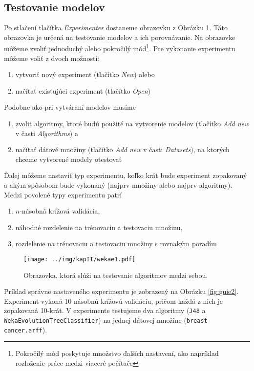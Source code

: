 \pagebreak

\subsection*{Testovanie modelov}
Po stlačení tlačítka \emph{Experimenter} dostaneme obrazovku z Obrázku \ref{fig:guie1}. Táto obrazovka je určená na testovanie modelov a ich porovnávanie. Na obrazovke môžeme zvoliť jednoduchý alebo pokročilý mód\footnote{Pokročilý mód poskytuje množstvo ďalších nastavení, ako napríklad rozloženie práce medzi viaceré počítače}. 
Pre vykonanie experimentu môžeme voliť z dvoch možností:
\begin{enumerate}
\item vytvoriť nový experiment (tlačítko \emph{New}) alebo
\item načítať existujúci experiment (tlačítko \emph{Open})
\end{enumerate} 

Podobne ako pri vytváraní modelov musíme
\begin{enumerate}
\item zvoliť algoritmy, ktoré budú použité na vytvorenie modelov (tlačítko \emph{Add new} v časti \emph{Algorithms}) a
\item načítať dátové množiny (tlačítko \emph{Add new} v časti \emph{Datasets}), na ktorých chceme vytvorené modely otestovať 
\end{enumerate}

Ďalej môžeme nastaviť typ experimentu, koľko krát bude experiment zopakovaný a akým spôsobom bude vykonaný (najprv množiny alebo najprv algoritmy). Medzi povolené typy experimentu patrí
\begin{enumerate}
\item $n$-násobná krížová validácia,
\item náhodné rozdelenie na trénovaciu a testovaciu množinu,
\item rozdelenie na trénovaciu a testovaciu množiny s rovnakým poradím
\end{enumerate}

\begin{figure}[h!]
\centering
\centerline{\mbox{\texttt{[image: ../img/kapII/wekae1.pdf]}}}
\caption{Obrazovka, ktorá slúži na testovanie algoritmov medzi sebou.}\label{fig:guie1}
\end{figure}

Príklad správne nastaveného experimentu je zobrazený na Obrázku \ref{fig:guie2}. Experiment vykoná 10-násobnú krížovú validáciu, pričom každá z nich je zopakovaná 10-krát. V experimente testujeme dva algoritmy (\verb|J48| a \verb|WekaEvolutionTreeClassifier|) na jednej dátovej množine (\verb|breast-cancer.arff|).

